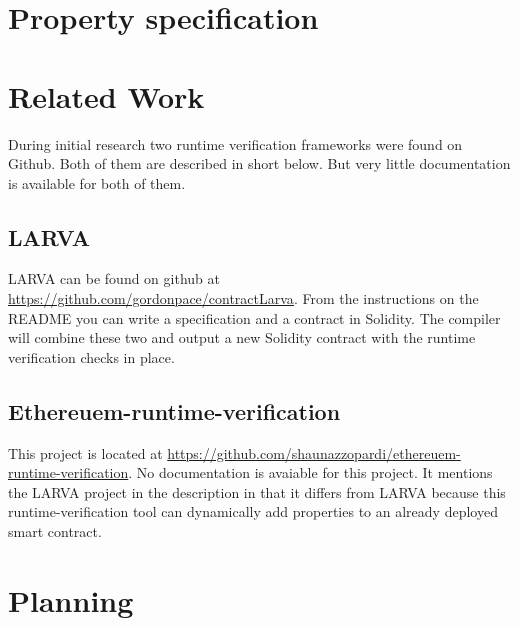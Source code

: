 \documentclass[a4paper]{article}
\begin{document}
\section{Property specification}


\section{Related Work}
During initial research two runtime verification frameworks were found on Github. Both of them are described in short below. But very little documentation is available for both of them.
\subsection{LARVA}
LARVA can be found on github at \url{https://github.com/gordonpace/contractLarva}. From the instructions on the README you can write a specification and a contract in Solidity. The compiler will combine these two and output a new Solidity contract with the runtime verification checks in place. 

\subsection{Ethereuem-runtime-verification}
This project is located at \url{https://github.com/shaunazzopardi/ethereuem-runtime-verification}. No documentation is avaiable for this project. It mentions the LARVA project in the description in that it differs from LARVA because this runtime-verification tool can dynamically add properties to an already deployed smart contract.



\section{Planning}
\end{document}
